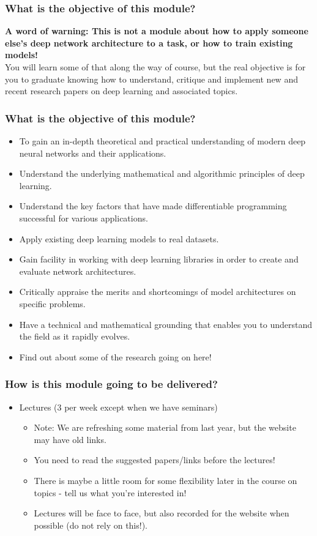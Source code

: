 \documentclass[]{article}
\begin{document}
\begin{frame}
	\frametitle{What is the objective of this module?}

	\textbf{A word of warning: This is not a module about how to apply someone else's deep network architecture to a task, or how to train existing models!}
	\\[1em]
	You will learn some of that along the way of course, but the real objective is for you to graduate knowing how to understand, critique and implement new and recent research papers on deep learning and associated topics.
\end{frame}

\begin{frame}
	\frametitle{What is the objective of this module?}
	\begin{itemize}
		\item<+-> To gain an in-depth theoretical and practical understanding of modern deep neural networks and their applications.
		\item<+-> Understand the underlying mathematical and algorithmic principles of deep learning.
		\item<+-> Understand the key factors that have made differentiable programming successful for various applications.
		\item<+-> Apply existing deep learning models to real datasets.
		\item<+-> Gain facility in working with deep learning libraries in order to create and evaluate network architectures.
		\item<+-> Critically appraise the merits and shortcomings of model architectures on specific problems.
		\item<+-> Have a technical and mathematical grounding that enables you to understand the field as it rapidly evolves.
		\item<+-> Find out about some of the research going on here!
	\end{itemize}
\end{frame}

\begin{frame}
	\frametitle{How is this module going to be delivered?}

	\begin{itemize}
		\item<+-> Lectures (3 per week except when we have seminars)
		\begin{itemize}
			\item Note: We are refreshing some material from last year, but the website may have old links.
			\item You need to read the suggested papers/links before the lectures!
			\item There is maybe a little room for some flexibility later in the course on topics - tell us what you're interested in!
			\item<+-> Lectures will be face to face, but also recorded for the website when possible (do not rely on this!).
		\end{itemize}
	\end{itemize}
\end{frame}
\end{document}
